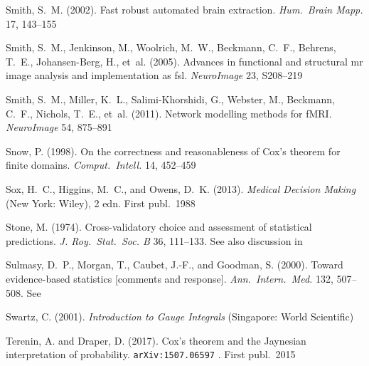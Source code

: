 \documentclass[%
]{frontiersSCNS-nologo} %
\providecommand{\href}[2]{#2}
\newcommand*{\citebi}[2][]{\citet[#1]{#2}%
}
\newcommand*{\arxiveprint}[1]{%
\texttt{\urlalt{https://arxiv.org/abs/#1}{arXiv:\hspace{0pt}#1}}%
}
\providecommand*{\urlalt}{\href}
\renewcommand*{\|}{\mathpunct{|}}%
\begin{document}
\begin{thebibliography}{156}
Smith, S.~M. (2002).
\newblock Fast robust automated brain extraction.
\newblock \emph{Hum.\ Brain Mapp.} 17, 143--155

Smith, S.~M., Jenkinson, M., Woolrich, M.~W., Beckmann, C.~F., Behrens, T.~E.,
  Johansen-Berg, H., et~al. (2005).
\newblock Advances in functional and structural mr image analysis and
  implementation as fsl.
\newblock \emph{NeuroImage} 23, S208--219

Smith, S.~M., Miller, K.~L., Salimi-Khorshidi, G., Webster, M., Beckmann,
  C.~F., Nichols, T.~E., et~al. (2011).
\newblock Network modelling methods for {fMRI}.
\newblock \emph{NeuroImage} 54, 875--891

Snow, P. (1998).
\newblock On the correctness and reasonableness of {Cox's} theorem for finite
  domains.
\newblock \emph{Comput.\ Intell.} 14, 452--459

Sox, H.~C., Higgins, M.~C., and Owens, D.~K. (2013).
\newblock \emph{Medical Decision Making} (New York: Wiley), 2 edn.
\newblock First publ.\ 1988

Stone, M. (1974).
\newblock Cross-validatory choice and assessment of statistical predictions.
\newblock \emph{J. Roy.\ Stat.\ Soc. B} 36, 111--133.
\newblock See also discussion in \citebi{barnardetal1974}

Sulmasy, D.~P., Morgan, T., Caubet, J.-F., and Goodman, S. (2000).
\newblock Toward evidence-based statistics {[}comments and response{]}.
\newblock \emph{Ann.\ Intern.\ Med.} 132, 507--508.
\newblock See \citebi{goodman1999,davidoff1999}

Swartz, C. (2001).
\newblock \emph{Introduction to Gauge Integrals} (Singapore: World Scientific)

Terenin, A. and Draper, D. (2017).
\newblock Cox's theorem and the {Jaynesian} interpretation of probability.
\newblock \arxiveprint{1507.06597}. First publ.\ 2015


\end{thebibliography}
\end{document}
